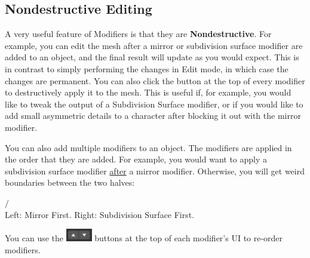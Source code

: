 \documentclass[11pt]{article}
\begin{document}
\subsection{Nondestructive Editing}
A very useful feature of Modifiers is that they are \textbf{Nondestructive}.  For example, you can
edit the mesh after a mirror or subdivision surface modifier are added to an object, and the final
result will update as you would expect.  This is in contrast to simply performing the changes in
Edit mode, in which case the changes are permanent.  You can also click the  button at
the top of every modifier to destructively apply it to the mesh.  This is useful if, for example,
you would like to tweak the output of a Subdivision Surface modifier, or if you would like to add
small asymmetric details to a character after blocking it out with the mirror modifier.

You can also add multiple modifiers to an object.  The modifiers are applied in the order that they
are added.  For example, you would want to apply a subdivision surface modifier \underline{after}
a mirror modifier.  Otherwise, you will get weird boundaries between the two halves:
\begin{center}
     $\Big /$ 
     \\
    Left: Mirror First.  Right: Subdivision Surface First.
\end{center}
You can use the \includegraphics[height=1.5em]{modifier-stack-arrows} buttons at the top of each
modifier's UI to re-order modifiers.
\end{document}
